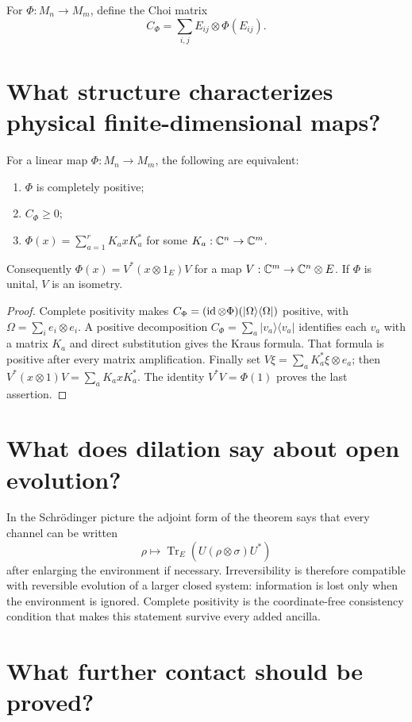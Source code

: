 For $\Phi:M_n\to M_m$, define the Choi matrix
\[
C_\Phi=\sum_{i,j}E_{ij}\otimes\Phi(E_{ij}).
\]

\section{What structure characterizes physical finite-dimensional maps?}

\begin{theorem}
For a linear map $\Phi:M_n\to M_m$, the following are equivalent:
\begin{enumerate}
\item $\Phi$ is completely positive;
\item $C_\Phi\geq0$;
\item $\Phi(x)=\sum_{a=1}^rK_axK_a^*$ for some $K_a:\mathbb C^n\to\mathbb C^m$.
\end{enumerate}
Consequently $\Phi(x)=V^*(x\otimes1_E)V$ for a map
$V:\mathbb C^m\to\mathbb C^n\otimes E$.  If $\Phi$ is unital, $V$ is an isometry.
\cite{choi,stinespring}
\end{theorem}

\begin{proof}
Complete positivity makes
$C_\Phi=(\operatorname{id}\otimes\Phi)(|\Omega\rangle\langle\Omega|)$ positive, with
$\Omega=\sum_i e_i\otimes e_i$.  A positive decomposition
$C_\Phi=\sum_a|v_a\rangle\langle v_a|$ identifies each $v_a$ with a matrix
$K_a$ and direct substitution gives the Kraus formula.  That formula is
positive after every matrix amplification.  Finally set
$V\xi=\sum_aK_a^*\xi\otimes e_a$; then
$V^*(x\otimes1)V=\sum_aK_axK_a^*$.  The identity
$V^*V=\Phi(1)$ proves the last assertion.
\end{proof}

\section{What does dilation say about open evolution?}

In the Schr\"odinger picture the adjoint form of the theorem says that every
channel can be written
\[
\rho\longmapsto\operatorname{Tr}_E(U(\rho\otimes\sigma)U^*)
\]
after enlarging the environment if necessary.  Irreversibility is therefore
compatible with reversible evolution of a larger closed system: information
is lost only when the environment is ignored.  Complete positivity is the
coordinate-free consistency condition that makes this statement survive
every added ancilla.

\section{What further contact should be proved?}

